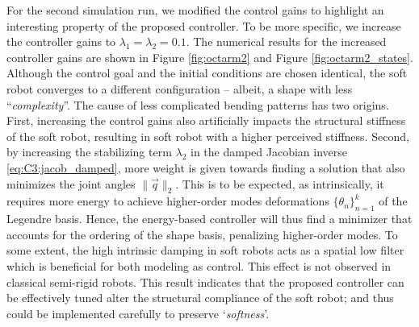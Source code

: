 \begin{example}
For the second simulation run, we modified the control gains to highlight an interesting property of the proposed controller. To be more specific, we increase the controller gains to $\lambda_1 = \lambda_2 = 0.1$. The numerical results for the increased controller gains are shown in Figure \ref{fig:octarm2} and Figure \ref{fig:octarm2_states}. Although the control goal and the initial conditions are chosen identical, the soft robot converges to a different configuration -- albeit, a shape with less ``\textit{complexity}''. The cause of less complicated bending patterns has two origins. First, increasing the control gains also artificially impacts the structural stiffness of the soft robot, resulting in soft robot with a higher perceived stiffness. Second, by increasing the stabilizing term $\lambda_2$ in the damped Jacobian inverse \eqref{eq:C3:jacob_damped}, more weight is given towards finding a solution that also minimizes the joint angles $\lVert \vec{q} \rVert_2 $.  This is to be expected, as intrinsically, it requires more energy to achieve higher-order modes deformations $\{\theta_n\}_{n=1}^k$ of the Legendre basis. Hence, the energy-based controller will thus find a minimizer that accounts for the ordering of the shape basis, penalizing higher-order modes. To some extent, the high intrinsic damping in soft robots acts as a spatial low filter which is beneficial for both modeling as control. This effect is not observed in classical semi-rigid robots.  This result indicates that the proposed controller can be effectively tuned alter the structural compliance of the soft robot; and thus could be implemented carefully to preserve `\textit{softness}'. 
\end{example}

